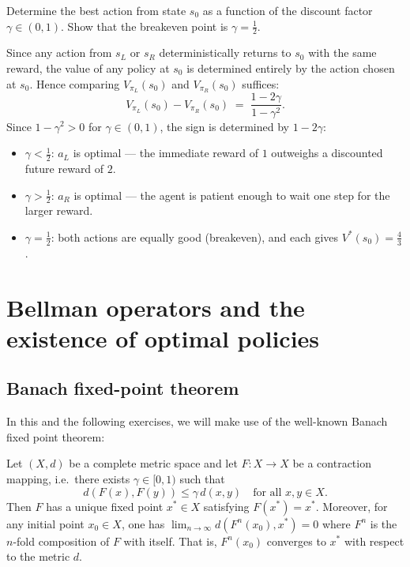 \documentclass[11pt]{article}
\begin{document}
\begin{exercise}
\label{prob:small_mdp_optimal} Determine the best action from state $s_0$ as a function of the discount factor $\gamma \in (0, 1)$. Show that the breakeven point is $\gamma = \tfrac{1}{2}$.
\end{exercise}

\begin{solution}
Since any action from $s_L$ or $s_R$ deterministically returns to $s_0$ with the same reward, the value of any policy at $s_0$ is determined entirely by the action chosen at $s_0$. Hence comparing $V_{\pi_L}(s_0)$ and $V_{\pi_R}(s_0)$ suffices:
$$
V_{\pi_L}(s_0) - V_{\pi_R}(s_0) \;=\; \frac{1 - 2\gamma}{1-\gamma^2}.
$$
Since $1 - \gamma^2 > 0$ for $\gamma \in (0,1)$, the sign is determined by $1 - 2\gamma$:
\begin{itemize}\itemsep=2pt
  \item $\gamma < \tfrac{1}{2}$: $a_L$ is optimal --- the immediate reward of $1$ outweighs a discounted future reward of $2$.
  \item $\gamma > \tfrac{1}{2}$: $a_R$ is optimal --- the agent is patient enough to wait one step for the larger reward.
  \item $\gamma = \tfrac{1}{2}$: both actions are equally good (breakeven), and each gives $V^*(s_0) = \tfrac{4}{3}$.
\end{itemize}
\end{solution}

\section{Bellman operators and the existence of optimal policies}\label{prob:bellman_ops}

\subsection*{Banach fixed-point theorem}

In this and the following exercises, we will make use of the well-known Banach fixed point theorem:

\begin{theorem}\label{thm:banach}
Let $(X, d)$ be a complete metric space and let $F : X \to X$ be a contraction mapping, i.e.\ there exists $\gamma \in [0,1)$ such that
$$
d(F(x), F(y)) \le \gamma\, d(x, y) \quad \text{for all } x, y \in X.
$$
Then $F$ has a unique fixed point $x^* \in X$ satisfying $F(x^*) = x^*$. Moreover, for any initial point $x_0 \in X$, one 
has $\lim_{n \to \infty} d(F^n(x_0), x^*) = 0$ 
where $F^n$ is the $n$-fold composition of $F$ with itself. That is, $F^n(x_0)$ converges to $x^*$ with respect to the metric $d$.
\end{theorem}
\end{document}
